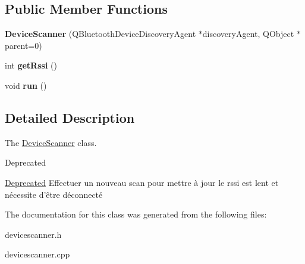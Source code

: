 \subsection*{Public Member Functions}
\begin{DoxyCompactItemize}
\item 
\hypertarget{classDeviceScanner_a9e1d9f474e82601f7eb2af132122c3a3}{{\bfseries Device\-Scanner} (Q\-Bluetooth\-Device\-Discovery\-Agent $\ast$discovery\-Agent, Q\-Object $\ast$parent=0)}\label{classDeviceScanner_a9e1d9f474e82601f7eb2af132122c3a3}

\item 
\hypertarget{classDeviceScanner_a9c2367a3b9402e2a86629e2ad4fe43b9}{int {\bfseries get\-Rssi} ()}\label{classDeviceScanner_a9c2367a3b9402e2a86629e2ad4fe43b9}

\item 
\hypertarget{classDeviceScanner_aa2b766edd46ce02861a1e9a65bfb2424}{void {\bfseries run} ()}\label{classDeviceScanner_aa2b766edd46ce02861a1e9a65bfb2424}

\end{DoxyCompactItemize}


\subsection{Detailed Description}
The \hyperlink{classDeviceScanner}{Device\-Scanner} class. 

\begin{DoxyRefDesc}{Deprecated}
\item[\hyperlink{deprecated__deprecated000001}{Deprecated}]Effectuer un nouveau scan pour mettre à jour le rssi est lent et nécessite d'être déconnecté \end{DoxyRefDesc}


The documentation for this class was generated from the following files\-:\begin{DoxyCompactItemize}
\item 
devicescanner.\-h\item 
devicescanner.\-cpp\end{DoxyCompactItemize}

